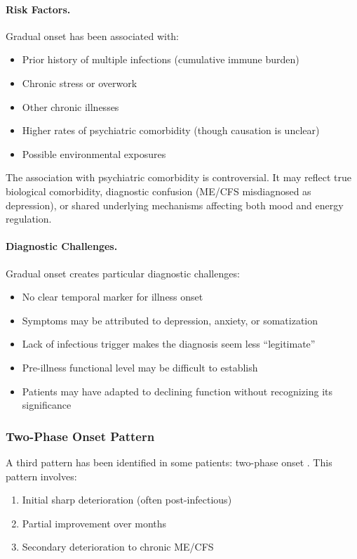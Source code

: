 \paragraph{Risk Factors.}
Gradual onset has been associated with:
\begin{itemize}
    \item Prior history of multiple infections (cumulative immune burden)
    \item Chronic stress or overwork
    \item Other chronic illnesses
    \item Higher rates of psychiatric comorbidity (though causation is unclear)
    \item Possible environmental exposures
\end{itemize}

The association with psychiatric comorbidity is controversial. It may reflect true biological comorbidity, diagnostic confusion (ME/CFS misdiagnosed as depression), or shared underlying mechanisms affecting both mood and energy regulation.

\paragraph{Diagnostic Challenges.}
Gradual onset creates particular diagnostic challenges:
\begin{itemize}
    \item No clear temporal marker for illness onset
    \item Symptoms may be attributed to depression, anxiety, or somatization
    \item Lack of infectious trigger makes the diagnosis seem less ``legitimate''
    \item Pre-illness functional level may be difficult to establish
    \item Patients may have adapted to declining function without recognizing its significance
\end{itemize}

\subsubsection{Two-Phase Onset Pattern}

A third pattern has been identified in some patients: two-phase onset \cite{Jason2019onset}. This pattern involves:
\begin{enumerate}
    \item Initial sharp deterioration (often post-infectious)
    \item Partial improvement over months
    \item Secondary deterioration to chronic ME/CFS
\end{enumerate}

